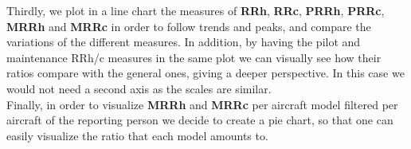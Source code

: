 \documentclass{article} %
\begin{document}
Thirdly, we plot in a line chart the measures of \textbf{RRh}, \textbf{RRc}, \textbf{PRRh}, \textbf{PRRc}, \textbf{MRRh} and \textbf{MRRc} in order to follow trends and peaks, and compare the variations of the different measures. In addition, by having the pilot and maintenance RRh/c measures in the same plot we can visually see how their ratios compare with the general ones, giving a deeper perspective. In this case we would not need a second axis as the scales are similar.\\

Finally, in order to visualize \textbf{MRRh} and \textbf{MRRc} per aircraft model filtered per aircraft of the reporting person we decide to create a pie chart, so that one can easily visualize the ratio that each model amounts to.\\
\end{document}
